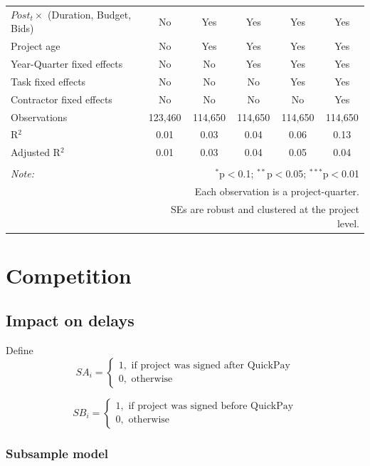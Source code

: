 \documentclass[
]{article}
\begin{document}
\begin{table}[H]
\begin{tabular}{@{\extracolsep{-2pt}}lccccc}
$Post_t \times $  (Duration, Budget, Bids) & No & Yes & Yes & Yes & Yes \\ 
Project age & No & Yes & Yes & Yes & Yes \\ 
Year-Quarter fixed effects & No & No & Yes & Yes & Yes \\ 
Task fixed effects & No & No & No & Yes & Yes \\ 
Contractor fixed effects & No & No & No & No & Yes \\ 
Observations & 123,460 & 114,650 & 114,650 & 114,650 & 114,650 \\ 
R$^{2}$ & 0.01 & 0.03 & 0.04 & 0.06 & 0.13 \\ 
Adjusted R$^{2}$ & 0.01 & 0.03 & 0.04 & 0.05 & 0.04 \\ 
\hline 
\hline \\[-1.8ex] 
\textit{Note:}  & \multicolumn{5}{r}{$^{*}$p$<$0.1; $^{**}$p$<$0.05; $^{***}$p$<$0.01} \\ 
 & \multicolumn{5}{r}{Each observation is a project-quarter.} \\ 
 & \multicolumn{5}{r}{SEs are robust and clustered at the project level.} \\ 
\end{tabular} 
\end{table}

\hypertarget{competition}{%
\section{Competition}\label{competition}}

\hypertarget{impact-on-delays}{%
\subsection{Impact on delays}\label{impact-on-delays}}

Define
\[ SA_i = \begin{cases} 1, \text{ if project was signed after QuickPay}\\
0, \text{ otherwise} \end{cases}\]

\[ SB_i = \begin{cases} 1, \text{ if project was signed before QuickPay}\\
0, \text{ otherwise} \end{cases}\]

\hypertarget{subsample-model}{%
\subsubsection{Subsample model}\label{subsample-model}}
\end{document}

